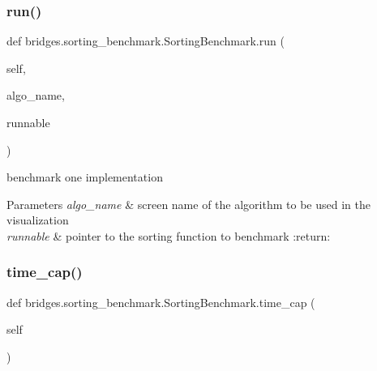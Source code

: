 \subsubsection{\texorpdfstring{run()}{run()}}
{\footnotesize\ttfamily def bridges.\+sorting\+\_\+benchmark.\+Sorting\+Benchmark.\+run (\begin{DoxyParamCaption}\item[{}]{self,  }\item[{}]{algo\+\_\+name,  }\item[{}]{runnable }\end{DoxyParamCaption})}



benchmark one implementation 


\begin{DoxyParams}{Parameters}
{\em algo\+\_\+name} & screen name of the algorithm to be used in the visualization \\
\hline
{\em runnable} & pointer to the sorting function to benchmark \+:return\+: \\
\hline
\end{DoxyParams}
\mbox{\label{classbridges_1_1sorting__benchmark_1_1_sorting_benchmark_a125d5bf68c5eb0fa1b319e37582fdc42}} 
\subsubsection{\texorpdfstring{time\_cap()}{time\_cap()}\hspace{0.1cm}{\footnotesize\ttfamily [1/2]}}
{\footnotesize\ttfamily def bridges.\+sorting\+\_\+benchmark.\+Sorting\+Benchmark.\+time\+\_\+cap (\begin{DoxyParamCaption}\item[{}]{self }\end{DoxyParamCaption})}

\mbox{\label{classbridges_1_1sorting__benchmark_1_1_sorting_benchmark_af0705baca355e23e9e92f8d85a5fd33f}} 
